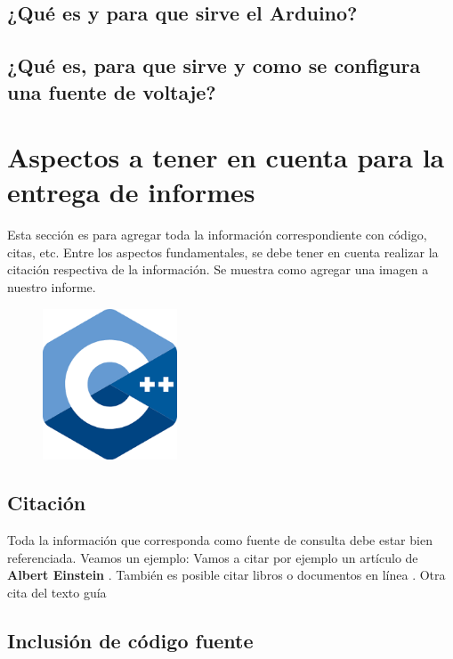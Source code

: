 \documentclass{article}
\begin{document}
\subsection{¿Qué es y para que sirve el Arduino?}

\subsection{¿Qué es, para que sirve y como se configura una fuente de voltaje?}

\section{Aspectos a tener en cuenta para la entrega de informes} \label{contenido}
Esta sección es para agregar toda la información correspondiente con código, citas, etc.\newline
Entre los aspectos fundamentales, se debe tener en cuenta realizar la citación respectiva de la información.\newline
Se muestra como agregar una imagen a nuestro informe.

\begin{figure}[!ht]
\includegraphics[width=4cm]{cpplogo.png}
\centering
\end{figure}

\subsection{Citación}
Toda la información que corresponda como fuente de consulta debe estar bien referenciada. Veamos un ejemplo:\newline
Vamos a citar por ejemplo un artículo de \textbf{Albert Einstein} \cite{einstein}.
También es posible citar libros \cite{dirac} o documentos en línea \cite{knuthwebsite}.
\newline
Otra cita del texto guía \cite{deitel1999c++}

\subsection{Inclusión de código fuente}
\end{document}
